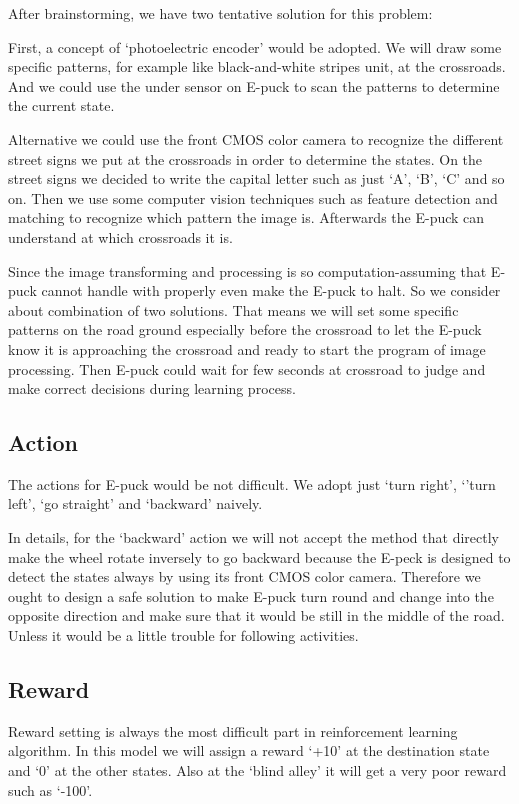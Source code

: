 \documentclass[
11pt, %
a4paper, %
oneside, %
headinclude%
BCOR3mm, %
]{scrartcl}
\begin{document}
After brainstorming, we have two tentative solution for this problem:


First, a concept of ‘photoelectric encoder’ would be adopted. 
We will draw some specific patterns, for example like black-and-white stripes unit, at the crossroads. And we could use the under sensor on E-puck to scan the patterns to determine the current state. 


Alternative we could use the front CMOS color camera to recognize the different street signs we put at the crossroads in order to determine the states. 
On the street signs we decided to write the capital letter such as just ‘A’, ‘B’, ‘C’ and so on. 
Then we use some computer vision techniques such as feature detection and matching to recognize which pattern the image is. 
Afterwards the E-puck can understand at which crossroads it is.


Since the image transforming and processing is so computation-assuming that E-puck cannot handle with properly even make the E-puck to halt. 
So we consider about combination of two solutions. 
That means we will set some specific patterns on the road ground especially before the crossroad to let the E-puck know it is approaching the crossroad and ready to start the program of image processing. 
Then E-puck could wait for few seconds at crossroad to judge and make correct decisions during learning process.

\subsection{Action}
The actions for E-puck would be not difficult. We adopt just ‘turn right’, ‘’turn left’, ‘go straight’ and ‘backward’ naively. 


In details, for the ‘backward’ action we will not accept the method that directly make the wheel rotate inversely to go backward because the E-peck is designed to detect the states always by using its front CMOS color camera. 
Therefore we ought to design a safe solution to make E-puck turn round and change into the opposite direction and make sure that it would be still in the middle of the road. Unless it would be a little trouble for following activities.

\subsection{Reward}
\quad Reward setting is always the most difficult part in reinforcement learning algorithm. 
In this model we will assign a reward ‘+10’ at the destination state and ‘0’ at the other states. 
Also at the ‘blind alley’ it will get a very poor reward such as ‘-100’.
\end{document}
